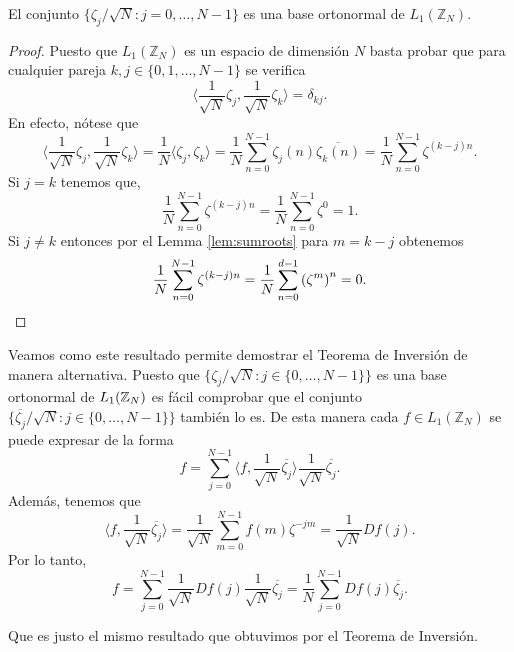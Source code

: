 \documentclass{article}
\begin{document}
\begin{lemma}
    El conjunto $\{ \zeta_j/\sqrt{N} : j=0,\dots,N-1\}$ es una base ortonormal de $L_1(\mathbb{Z}_N).$
\end{lemma}
\begin{proof}
  Puesto que $L_1(\mathbb{Z}_N)$ es un espacio de dimensión $N$ basta probar que para cualquier pareja $k,j \in \{0,1,\ldots,N-1\}$ se verifica
  \[
  \langle \frac{1}{\sqrt{N}} \zeta_j,\frac{1}{\sqrt{N}} \zeta_k\rangle=\delta_{kj}.
  \]
  En efecto, nótese que
  \[
  \langle \frac{1}{\sqrt{N}} \zeta_j,\frac{1}{\sqrt{N}} \zeta_k\rangle=\frac{1}{N}\langle \zeta_j, \zeta_k\rangle=\frac{1}{N}\sum_{n=0}^{N-1} \zeta_j(n)\overline{ \zeta_k(n)}=\frac{1}{N}\sum_{n=0}^{N-1} \zeta^{(k-j)n}.
  \]
  Si $j=k$ tenemos que,
  \[\frac{1}{N}\sum_{n=0}^{N-1} \zeta^{(k-j)n}=\frac{1}{N}\sum_{n=0}^{N-1} \zeta^{0}=1.\]
  Si $j\neq k$ entonces por el Lemma \ref{lem:sumroots} para $m=k-j$ obtenemos
  \[\frac{1}{N}\sum_{n=0}^{N-1}\zeta^{(k-j)n}=\frac{1}{N}\sum_{n=0}^{d-1}\left(\zeta^m\right)^n=0. \qedhere\]
\end{proof}

Veamos como este resultado permite demostrar el Teorema de Inversión de manera alternativa. Puesto que  $\{ \zeta_j/\sqrt{N} : j\in\{0,\dots,N-1\}\}$ es una base ortonormal de $L_1(\mathbb{Z}_N)$ es fácil comprobar que el conjunto $\{\overline{ \zeta_j}/\sqrt{N} : j\in\{0,\dots,N-1\}\}$ también lo es.
De esta manera cada $f\in L_1(\mathbb{Z}_N)$ se puede expresar de la forma
\[f=\sum_{j=0}^{N-1}\langle f,\frac{1}{\sqrt{N}}\overline{ \zeta_j}\rangle \frac{1}{\sqrt{N}}\overline{ \zeta_j}.\]
Además, tenemos que
\[\langle f,\frac{1}{\sqrt{N}}\overline{ \zeta_j}\rangle=\frac{1}{\sqrt{N}}\sum_{m=0}^{N-1}f(m) \zeta^{-jm}=\frac{1}{\sqrt{N}}Df(j).\]
Por lo tanto, 
\[f=\sum_{j=0}^{N-1} \frac{1}{\sqrt{N}}Df(j)\frac{1}{\sqrt{N}}\overline{ \zeta_j}=\frac{1}{N}\sum_{j=0}^{N-1}Df(j)\overline{ \zeta_j}.\]

Que es justo el mismo resultado que obtuvimos por el Teorema de Inversión.
\end{document}
